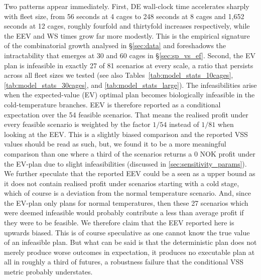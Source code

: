 \documentclass[12pt,a4paper]{article}
\begin{document}
Two patterns appear immediately. First, DE wall-clock time accelerates
sharply with fleet size, from 56 seconds at 4 cages to 248 seconds at 8
cages and 1{,}652 seconds at 12 cages, roughly fourfold and thirtyfold
increases respectively, while the EEV and WS times grow far more
modestly. This is the empirical signature of the combinatorial growth
analysed in §\ref{sec:data} and foreshadows the intractability that
emerges at 30 and 60 cages in §\ref{sec:sp_vs_ef}. Second, the EV plan is infeasible 
in exactly 27 of 81 scenarios at every
scale, a ratio that persists across all fleet sizes we tested (see also
Tables~\ref{tab:model_stats_10cages}, \ref{tab:model_stats_30cages}, and
\ref{tab:model_stats_large}). 
The infeasibilities arise when 
the expected-value (EV) optimal plan becomes biologically infeasible in the cold-temperature branches. EEV is therefore reported as a conditional expectation over the 54 feasible scenarios. That means the realised profit under every feasible scenario is weighted by the factor $1/54$ instead of $1/81$ when looking at the EEV. This is a slightly biased comparison and the reported VSS values should be read as such, but, we found it to be a more meaningful comparison than one where a third of the scenarios returns a 0 NOK profit under the EV-plan due to slight infeasibilities (discussed in \ref{sec:sensitivity_params}). We further speculate that the reported EEV could be a seen as a upper bound as it does not contain realised profit under scenarios starting with a cold stage, which of course is a deviation from the normal temperature scenario. And, since the EV-plan only plans for normal temperatures, then these 27 scenarios which were deemed infeasible would probably contribute a less than average profit if they were to be feasible. We therefore claim that the EEV reported here is upwards biased. This is of course speculative as one cannot know the true value of an infeasible plan. But what can be said is that the deterministic plan does not merely produce worse outcomes in expectation, it produces no executable plan at all in roughly a third of futures, a robustness failure that the conditional VSS metric probably understates.
\end{document}
